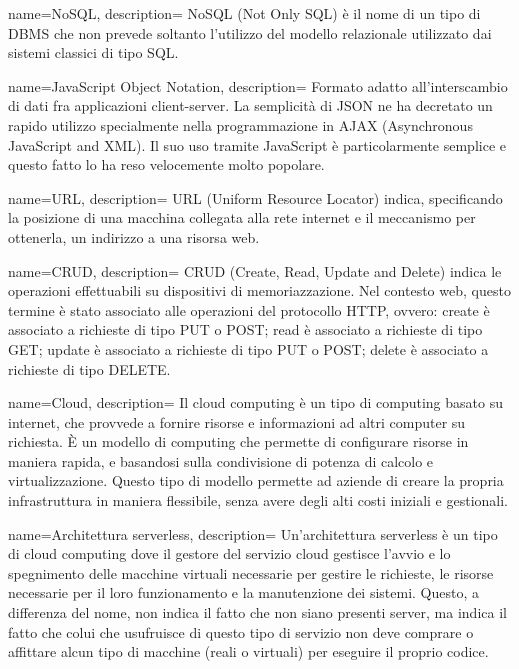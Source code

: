  {
  name=NoSQL,
  description={
NoSQL (Not Only SQL) è il nome di un tipo di DBMS che non prevede soltanto
l'utilizzo del modello relazionale utilizzato dai sistemi classici di tipo SQL.
}
}

 {
  name=JavaScript Object Notation,
  description={
Formato adatto all’interscambio di dati fra applicazioni client-server. La
semplicità di JSON ne ha decretato un rapido utilizzo specialmente nella
programmazione in AJAX (Asynchronous JavaScript and XML). Il suo uso tramite
JavaScript è particolarmente semplice e questo fatto lo ha reso velocemente
molto popolare.
}
}

 {
  name=URL,
  description={
URL (Uniform Resource Locator) indica, specificando la posizione di una macchina
collegata alla rete internet e il meccanismo per ottenerla, un indirizzo a una
risorsa web.
}
}

 {
  name=CRUD,
  description={
CRUD (Create, Read, Update and Delete) indica le operazioni effettuabili su
dispositivi di memoriazzazione. Nel contesto web, questo termine è stato
associato alle operazioni del protocollo HTTP, ovvero: create è
associato a richieste di tipo PUT o POST; read è associato a richieste di tipo
GET; update è associato a richieste di tipo PUT o POST; delete è associato a
richieste di tipo DELETE.
}
}

 {
  name=Cloud,
  description={
Il cloud computing è un tipo di computing basato su internet, che provvede a
fornire risorse e informazioni ad altri computer su richiesta. È un modello di
computing che permette di configurare risorse in maniera rapida, e basandosi
sulla condivisione di potenza di calcolo e virtualizzazione. Questo tipo di
modello permette ad aziende di creare la propria infrastruttura in maniera
flessibile, senza avere degli alti costi iniziali e gestionali.
}
}

 {
  name=Architettura serverless,
  description={
Un'architettura serverless è un tipo di cloud computing dove il gestore del
servizio cloud gestisce l'avvio e lo spegnimento delle macchine virtuali
necessarie per gestire le richieste, le risorse necessarie per il loro
funzionamento e la manutenzione dei sistemi. Questo, a differenza del nome, non
indica il fatto che non siano presenti server, ma indica il fatto che colui che
usufruisce di questo tipo di servizio non deve comprare o affittare alcun tipo
di macchine (reali o virtuali) per eseguire il proprio codice.
}
}

